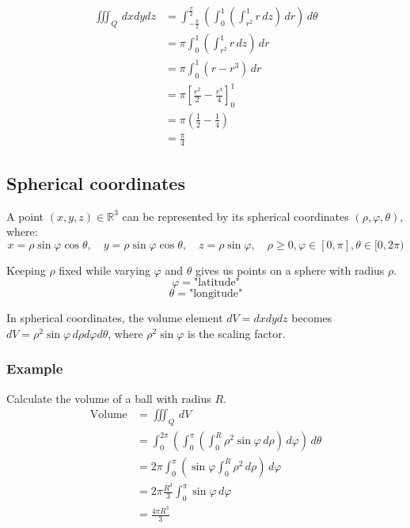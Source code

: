 \documentclass[11pt]{article}
\begin{document}
\begin{align*}
\iiint_Q \, dx dy dz &= \int_{-\frac{\pi}{2}}^{\frac{\pi}{2}} \left( \int_0^1 \left( \int_{r^2}^1 r \, dz \right) \, dr \right) \, d \theta \\
&= \pi \int_0^1 \left(\int_{r^2}^1 r \, dz \right) \, dr \\
&= \pi \int_0^1 (r - r^3) \, dr \\
&= \pi \left[\frac{r^2}{2} - \frac{r^4}{4} \right]_0^1 \\
&= \pi \left(\frac{1}{2} - \frac{1}{4} \right) \\
&= \frac{\pi}{4}
\end{align*}

\newpage

\subsection{Spherical coordinates}
\label{sec:org49206aa}
A point \((x, y, z) \in \mathbb{R}^3\) can be represented by its spherical coordinates \((\rho, \varphi, \theta)\), where:
\[x = \rho \sin \varphi \cos \theta, \quad y = \rho \sin \varphi \cos \theta, \quad z = \rho \sin \varphi, \quad \rho \ge 0, \varphi \in [0, \pi], \theta \in [0, 2\pi)\]

Keeping \(\rho\) fixed while varying \(\varphi\) and \(\theta\) gives us points on a sphere with radius \(\rho\).
\[\varphi = \text{"latitude"}\]
\[\theta = \text{"longitude"}\]

In spherical coordinates, the volume element \(dV = dx dy dz\) becomes \(dV = \rho^2 \sin \varphi \, d \rho d \varphi d \theta\), where \(\rho^2 \sin \varphi\) is the scaling factor.

\subsubsection{Example}
\label{sec:orgbad7f4b}
Calculate the volume of a ball with radius \(R\).
\begin{align*}
\text{Volume} &= \iiint_Q \, dV \\
&= \int_0^{2 \pi} \left( \int_0^\pi \left(\int_0^R \rho^2 \sin \varphi \, d \rho \right) \, d \varphi \right) \, d \theta \\
&= 2 \pi \int_0^{\pi} \left( \sin \varphi \int_0^R \rho^2 \, d \rho \right) \, d \varphi \\
&= 2 \pi \frac{R^3}{3} \int_0^{\pi} \sin \varphi \, d \varphi \\
&= \frac{4 \pi R^3}{3}
\end{align*}
\end{document}
